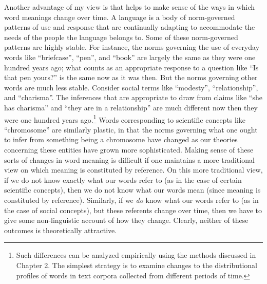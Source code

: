 Another advantage of my view is that helps to make sense of the ways in which word meanings change over time. A language is a body of norm-governed patterns of use and response that are continually adapting to accommodate the needs of the people the language belongs to. Some of these norm-governed patterns are highly stable. For instance, the norms governing the use of everyday words like ``briefcase'', ``pen'', and ``book'' are largely the same as they were one hundred years ago; what counts as an appropriate response to a question like ``Is that pen yours?'' is the same now as it was then. But the norms governing other words are much less stable. Consider social terms like ``modesty'', ``relationship'', and ``charisma''. The inferences that are appropriate to draw from claims like ``she has charisma'' and ``they are in a relationship'' are much different now then they were one hundred years ago.\footnote{Such differences can be analyzed empirically using the methods discussed in Chapter 2. The simplest strategy is to examine changes to the distributional profiles of words in text corpora collected from different periods of time.} Words corresponding to scientific concepts like ``chromosome'' are similarly plastic, in that the norms governing what one ought to infer from something being a chromosome have changed as our theories concerning these entities have grown more sophisticated. Making sense of these sorts of changes in word meaning is difficult if one maintains a more traditional view on which meaning is constituted by reference. On this more traditional view, if we do not know exactly what our words refer to (as in the case of certain scientific concepts), then we do not know what our words mean (since meaning is constituted by reference). Similarly, if we \textit{do} know what our words refer to (as in the case of social concepts), but these referents change over time, then we have to give some non-linguistic account of how they change. Clearly, neither of these outcomes is theoretically attractive.  

